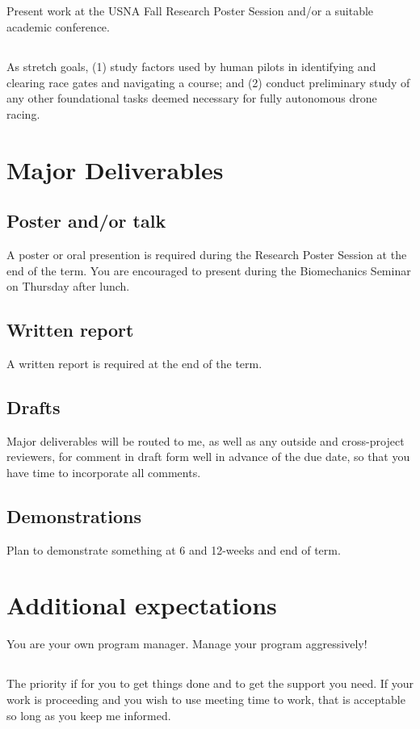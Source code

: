 \documentclass[10pt,courier]{navymemo}
\begin{document}
\subsection{} Present work at the USNA Fall Research Poster Session and/or a suitable academic conference. 
\subsection{} As stretch goals, (1) study factors used by human pilots in identifying and clearing race gates and navigating a course; and (2) conduct preliminary study of any other foundational tasks deemed necessary for fully autonomous drone racing. 

\section{Major Deliverables}
\subsection{Poster and/or talk} A poster or oral presention is required during the Research Poster Session at the end of the term. You are encouraged to present during the Biomechanics Seminar on Thursday after lunch. 
\subsection{Written report} A written report is required at the end of the term. 
\subsection{Drafts} Major deliverables will be routed to me, as well as any outside and cross-project reviewers, for comment in draft form well in advance of the due date, so that you have time to incorporate all comments. 
\subsection{Demonstrations} Plan to demonstrate something at 6 and 12-weeks and end of term. 

\section{Additional expectations} You are your own program manager. Manage your program aggressively!
\subsection{} The priority if for you to get things done and to get the support you need. If your work is proceeding and you wish to use meeting time to work, that is acceptable so long as you keep me informed. 
\end{document}

